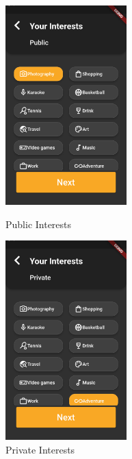 \documentclass{article}
\begin{document}
\begin{figure}[!htb]
	\centering
	\begin{minipage}{.45\textwidth}
		\centering
		\includegraphics[height=7.7cm,keepaspectratio]{assets/images/ui/signup/10-public-interest-selected.png}
		\caption{Public Interests}
	\end{minipage}\quad
	\begin{minipage}{.45\textwidth}
		\centering
		\includegraphics[height=7.7cm,keepaspectratio]{assets/images/ui/signup/12-private-interest-selected.png}
		\caption{Private Interests}
	\end{minipage}
\end{figure}
\end{document}
